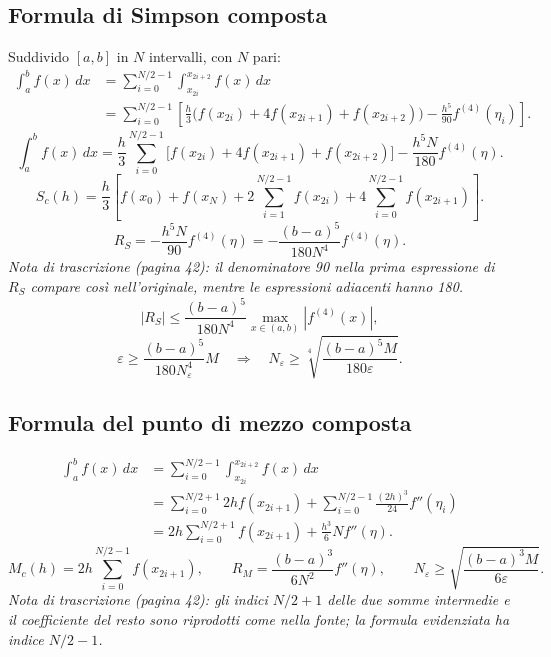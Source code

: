 \subsection*{Formula di Simpson composta}
Suddivido $[a,b]$ in $N$ intervalli, con $N$ pari:
\begin{align*}
\int_a^b f(x)\,dx&=\sum_{i=0}^{N/2-1}\int_{x_{2i}}^{x_{2i+2}}f(x)\,dx\\
&=\sum_{i=0}^{N/2-1}\left[\frac h3\bigl(f(x_{2i})+4f(x_{2i+1})+f(x_{2i+2})\bigr)-\frac{h^5}{90}f^{(4)}(\eta_i)\right].
\end{align*}
\[\int_a^b f(x)\,dx=\frac h3\sum_{i=0}^{N/2-1}\bigl[f(x_{2i})+4f(x_{2i+1})+f(x_{2i+2})\bigr]-\frac{h^5N}{180}f^{(4)}(\eta).\]
\[\boxed{S_c(h)=\frac h3\left[f(x_0)+f(x_N)+2\sum_{i=1}^{N/2-1}f(x_{2i})+4\sum_{i=0}^{N/2-1}f(x_{2i+1})\right]}.\]
\[R_S=-\frac{h^5N}{90}f^{(4)}(\eta)=-\boxed{\frac{(b-a)^5}{180N^4}f^{(4)}(\eta)}.\]
\emph{Nota di trascrizione (pagina 42): il denominatore 90 nella prima espressione di $R_S$ compare così nell'originale, mentre le espressioni adiacenti hanno 180.}
\[|R_S|\le\frac{(b-a)^5}{180N^4}\max_{x\in(a,b)}|f^{(4)}(x)|,\]
\[\varepsilon\ge\frac{(b-a)^5}{180N_\varepsilon^4}M\quad\Longrightarrow\quad
N_\varepsilon\ge\sqrt[4]{\frac{(b-a)^5M}{180\varepsilon}}.\]
\subsection*{Formula del punto di mezzo composta}
\begin{align*}
\int_a^b f(x)\,dx&=\sum_{i=0}^{N/2-1}\int_{x_{2i}}^{x_{2i+2}}f(x)\,dx\\
&=\sum_{i=0}^{N/2+1}2h f(x_{2i+1})+\sum_{i=0}^{N/2-1}\frac{(2h)^3}{24}f''(\eta_i)\\
&=2h\sum_{i=0}^{N/2+1}f(x_{2i+1})+\frac{h^3}{6}Nf''(\eta).
\end{align*}
\[\boxed{M_c(h)=2h\sum_{i=0}^{N/2-1}f(x_{2i+1})},\qquad
\boxed{R_M=\frac{(b-a)^3}{6N^2}f''(\eta)},\qquad N_\varepsilon\ge\sqrt{\frac{(b-a)^3M}{6\varepsilon}}.\]
\emph{Nota di trascrizione (pagina 42): gli indici $N/2+1$ delle due somme intermedie e il coefficiente del resto sono riprodotti come nella fonte; la formula evidenziata ha indice $N/2-1$.}
